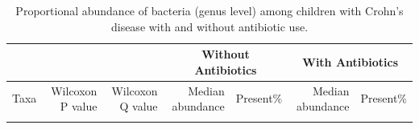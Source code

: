 \newpage
{\footnotesize
	\renewcommand{\arraystretch}{0.7} \setlength{\tabcolsep}{3pt}
	\begin{longtable}{ | l | r | r | r | r | r | r  | }
		\caption[Proportional abundance of bacteria (genus level) among children with Crohn’s disease  with and without antibiotic use]{Proportional abundance of bacteria (genus level) among children with Crohn’s disease with and without antibiotic use.} 
		\label{TS7} \\
		
		\hline
		\multicolumn{3}{|c|}{} & \multicolumn{2}{c}{Without Antibiotics}
		& \multicolumn{2}{|c|}{With Antibiotics}\\
		\hline 
		Taxa & Wilcoxon P value & Wilcoxon Q value & Median abundance & Present\% & Median abundance & Present\% \\ 
		\hline 
		\endfirsthead
		
		
		\endfoot
		
		\hline 
		\endlastfoot
		
		
		

\end{longtable}}
